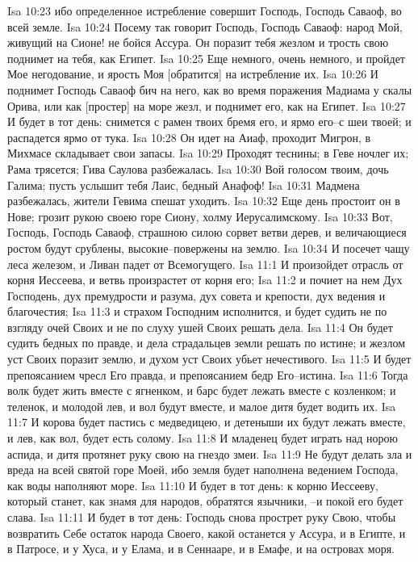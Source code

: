 Isa 10:23  ибо определенное истребление совершит Господь, Господь Саваоф, во всей земле.
Isa 10:24  Посему так говорит Господь, Господь Саваоф: народ Мой, живущий на Сионе! не бойся Ассура. Он поразит тебя жезлом и трость свою поднимет на тебя, как Египет.
Isa 10:25  Еще немного, очень немного, и пройдет Мое негодование, и ярость Моя [обратится] на истребление их.
Isa 10:26  И поднимет Господь Саваоф бич на него, как во время поражения Мадиама у скалы Орива, или как [простер] на море жезл, и поднимет его, как на Египет.
Isa 10:27  И будет в тот день: снимется с рамен твоих бремя его, и ярмо его--с шеи твоей; и распадется ярмо от тука.
Isa 10:28  Он идет на Аиаф, проходит Мигрон, в Михмасе складывает свои запасы.
Isa 10:29  Проходят теснины; в Геве ночлег их; Рама трясется; Гива Саулова разбежалась.
Isa 10:30  Вой голосом твоим, дочь Галима; пусть услышит тебя Лаис, бедный Анафоф!
Isa 10:31  Мадмена разбежалась, жители Гевима спешат уходить.
Isa 10:32  Еще день простоит он в Нове; грозит рукою своею горе Сиону, холму Иерусалимскому.
Isa 10:33  Вот, Господь, Господь Саваоф, страшною силою сорвет ветви дерев, и величающиеся ростом будут срублены, высокие--повержены на землю.
Isa 10:34  И посечет чащу леса железом, и Ливан падет от Всемогущего.
Isa 11:1  И произойдет отрасль от корня Иессеева, и ветвь произрастет от корня его;
Isa 11:2  и почиет на нем Дух Господень, дух премудрости и разума, дух совета и крепости, дух ведения и благочестия;
Isa 11:3  и страхом Господним исполнится, и будет судить не по взгляду очей Своих и не по слуху ушей Своих решать дела.
Isa 11:4  Он будет судить бедных по правде, и дела страдальцев земли решать по истине; и жезлом уст Своих поразит землю, и духом уст Своих убьет нечестивого.
Isa 11:5  И будет препоясанием чресл Его правда, и препоясанием бедр Его--истина.
Isa 11:6  Тогда волк будет жить вместе с ягненком, и барс будет лежать вместе с козленком; и теленок, и молодой лев, и вол будут вместе, и малое дитя будет водить их.
Isa 11:7  И корова будет пастись с медведицею, и детеныши их будут лежать вместе, и лев, как вол, будет есть солому.
Isa 11:8  И младенец будет играть над норою аспида, и дитя протянет руку свою на гнездо змеи.
Isa 11:9  Не будут делать зла и вреда на всей святой горе Моей, ибо земля будет наполнена ведением Господа, как воды наполняют море.
Isa 11:10  И будет в тот день: к корню Иессееву, который станет, как знамя для народов, обратятся язычники, --и покой его будет слава.
Isa 11:11  И будет в тот день: Господь снова прострет руку Свою, чтобы возвратить Себе остаток народа Своего, какой останется у Ассура, и в Египте, и в Патросе, и у Хуса, и у Елама, и в Сеннааре, и в Емафе, и на островах моря.
